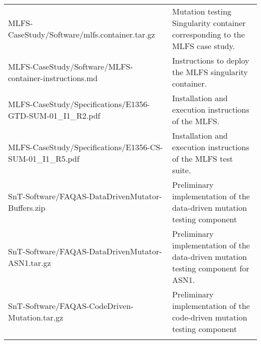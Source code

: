 \begin{longtable}{|p{8cm}|p{8cm}@{}|}
\hline
MLFS-CaseStudy/Software/mlfs.container.tar.gz&Mutation testing Singularity container corresponding to the MLFS case study.\\
MLFS-CaseStudy/Software/MLFS-container-instructions.md&Instructions to deploy the MLFS singularity container.\\
MLFS-CaseStudy/Specifications/E1356-GTD-SUM-01\_I1\_R2.pdf&Installation and execution instructions of the MLFS.\\
MLFS-CaseStudy/Specifications/E1356-CS-SUM-01\_I1\_R5.pdf&Installation and execution instructions of the MLFS test suite.\\
\hline
SnT-Software/FAQAS-DataDrivenMutator-Buffers.zip&Preliminary implementation of the data-driven mutation testing component\\
SnT-Software/FAQAS-DataDrivenMutator-ASN1.tar.gz&Preliminary implementation of the data-driven mutation testing component for ASN1.\\
SnT-Software/FAQAS-CodeDriven-Mutation.tar.gz&Preliminary implementation of the code-driven mutation testing component\\
\\
\hline


                                                    
\end{longtable}
\normalsize

\clearpage